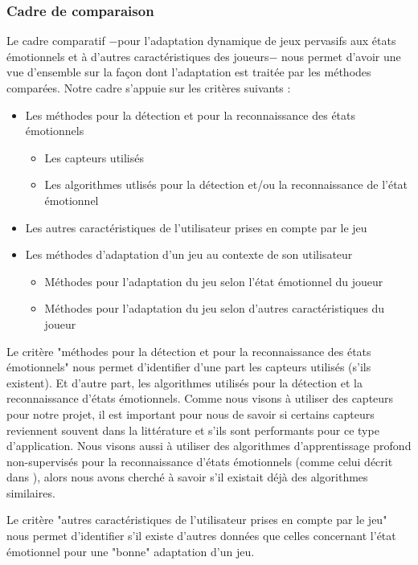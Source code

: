 \documentclass[11pt]{article}
\begin{document}
		\subsubsection{Cadre de comparaison}
			Le cadre comparatif $-$pour l'adaptation dynamique de jeux pervasifs aux états émotionnels et à d'autres caractéristiques des joueurs$-$ nous permet d'avoir une vue d'ensemble sur la façon dont l'adaptation est traitée par les méthodes comparées.
			Notre cadre s'appuie sur les critères suivants :
			\begin{itemize}
				\item Les méthodes pour la détection et pour la reconnaissance des états émotionnels
				\begin{itemize}
					\item Les capteurs utilisés
					\item Les algorithmes utlisés pour la détection et/ou la reconnaissance de l'état émotionnel
				\end{itemize}
				\item Les autres caractéristiques de l'utilisateur prises en compte par le jeu
				\item Les méthodes d'adaptation d'un jeu au contexte de son utilisateur
				\begin{itemize}
					\item Méthodes pour l'adaptation du jeu selon l'état émotionnel du joueur
					\item Méthodes pour l'adaptation du jeu selon d'autres caractéristiques du joueur
				\end{itemize}
			\end{itemize}\par
			Le critère "méthodes pour la détection et pour la reconnaissance des états émotionnels" nous permet d'identifier d'une part les capteurs utilisés (s'ils existent).
			Et d'autre part, les algorithmes utilisés pour la détection et la reconnaissance d'états émotionnels.
			Comme nous visons à utiliser des capteurs pour notre projet, il est important pour nous de savoir si certains capteurs reviennent souvent dans la littérature et s'ils sont performants pour ce type d'application.
			Nous visons aussi à utiliser des algorithmes d'apprentissage profond non-supervisés pour la reconnaissance d'états émotionnels (comme celui décrit dans \cite{gal_et_al._2020}), alors nous avons cherché à savoir s'il existait déjà des algorithmes similaires.\par
			Le critère "autres caractéristiques de l'utilisateur prises en compte par le jeu" nous permet d'identifier s'il existe d'autres données que celles concernant l'état émotionnel pour une "bonne" adaptation d'un jeu.
\end{document}

